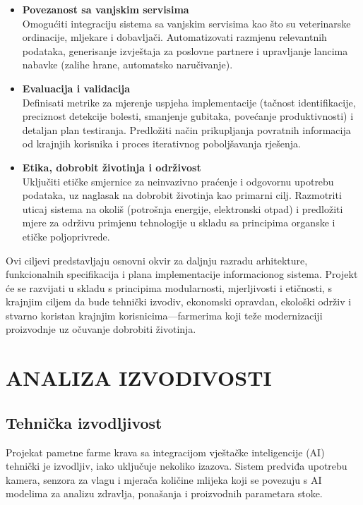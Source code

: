 \documentclass{article}
\begin{document}
\begin{itemize}
\item \textbf{Povezanost sa vanjskim servisima}\\
Omogućiti integraciju sistema sa vanjskim servisima kao što su veterinarske ordinacije, mljekare i dobavljači. Automatizovati razmjenu relevantnih podataka, generisanje izvještaja za poslovne partnere i upravljanje lancima nabavke (zalihe hrane, automatsko naručivanje).

\item \textbf{Evaluacija i validacija}\\
Definisati metrike za mjerenje uspjeha implementacije (tačnost identifikacije, preciznost detekcije bolesti, smanjenje gubitaka, povećanje produktivnosti) i detaljan plan testiranja. Predložiti način prikupljanja povratnih informacija od krajnjih korisnika i proces iterativnog poboljšavanja rješenja.

\item \textbf{Etika, dobrobit životinja i održivost}\\
Uključiti etičke smjernice za neinvazivno praćenje i odgovornu upotrebu podataka, uz naglasak na dobrobit životinja kao primarni cilj. Razmotriti uticaj sistema na okoliš (potrošnja energije, elektronski otpad) i predložiti mjere za održivu primjenu tehnologije u skladu sa principima organske i etičke poljoprivrede.
\end{itemize}

\vspace{1em}
\noindent
Ovi ciljevi predstavljaju osnovni okvir za daljnju razradu arhitekture, funkcionalnih specifikacija i plana implementacije informacionog sistema. Projekt će se razvijati u skladu s principima modularnosti, mjerljivosti i etičnosti, s krajnjim ciljem da bude tehnički izvodiv, ekonomski opravdan, ekološki održiv i stvarno koristan krajnjim korisnicima---farmerima koji teže modernizaciji proizvodnje uz očuvanje dobrobiti životinja.

\newpage
\section{ANALIZA IZVODIVOSTI}

\subsection{Tehnička izvodljivost}

Projekat pametne farme krava sa integracijom vještačke inteligencije (AI) tehnički je izvodljiv, iako uključuje nekoliko izazova. Sistem predviđa upotrebu kamera, senzora za vlagu i mjerača količine mlijeka koji se povezuju s AI modelima za analizu zdravlja, ponašanja i proizvodnih parametara stoke. \\
\end{document}
